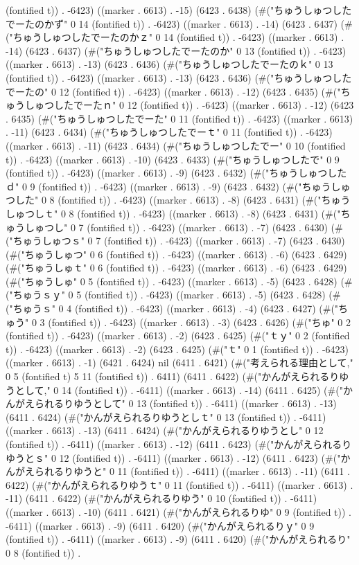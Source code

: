 (fontified t)) . -6423) ((marker . 6613) . -15) (6423 . 6438) (#("ちゅうしゅつしたでーたのかず" 0 14 (fontified t)) . -6423) ((marker . 6613) . -14) (6423 . 6437) (#("ちゅうしゅつしたでーたのかｚ" 0 14 (fontified t)) . -6423) ((marker . 6613) . -14) (6423 . 6437) (#("ちゅうしゅつしたでーたのか" 0 13 (fontified t)) . -6423) ((marker . 6613) . -13) (6423 . 6436) (#("ちゅうしゅつしたでーたのｋ" 0 13 (fontified t)) . -6423) ((marker . 6613) . -13) (6423 . 6436) (#("ちゅうしゅつしたでーたの" 0 12 (fontified t)) . -6423) ((marker . 6613) . -12) (6423 . 6435) (#("ちゅうしゅつしたでーたｎ" 0 12 (fontified t)) . -6423) ((marker . 6613) . -12) (6423 . 6435) (#("ちゅうしゅつしたでーた" 0 11 (fontified t)) . -6423) ((marker . 6613) . -11) (6423 . 6434) (#("ちゅうしゅつしたでーｔ" 0 11 (fontified t)) . -6423) ((marker . 6613) . -11) (6423 . 6434) (#("ちゅうしゅつしたでー" 0 10 (fontified t)) . -6423) ((marker . 6613) . -10) (6423 . 6433) (#("ちゅうしゅつしたで" 0 9 (fontified t)) . -6423) ((marker . 6613) . -9) (6423 . 6432) (#("ちゅうしゅつしたｄ" 0 9 (fontified t)) . -6423) ((marker . 6613) . -9) (6423 . 6432) (#("ちゅうしゅつした" 0 8 (fontified t)) . -6423) ((marker . 6613) . -8) (6423 . 6431) (#("ちゅうしゅつしｔ" 0 8 (fontified t)) . -6423) ((marker . 6613) . -8) (6423 . 6431) (#("ちゅうしゅつし" 0 7 (fontified t)) . -6423) ((marker . 6613) . -7) (6423 . 6430) (#("ちゅうしゅつｓ" 0 7 (fontified t)) . -6423) ((marker . 6613) . -7) (6423 . 6430) (#("ちゅうしゅつ" 0 6 (fontified t)) . -6423) ((marker . 6613) . -6) (6423 . 6429) (#("ちゅうしゅｔ" 0 6 (fontified t)) . -6423) ((marker . 6613) . -6) (6423 . 6429) (#("ちゅうしゅ" 0 5 (fontified t)) . -6423) ((marker . 6613) . -5) (6423 . 6428) (#("ちゅうｓｙ" 0 5 (fontified t)) . -6423) ((marker . 6613) . -5) (6423 . 6428) (#("ちゅうｓ" 0 4 (fontified t)) . -6423) ((marker . 6613) . -4) (6423 . 6427) (#("ちゅう" 0 3 (fontified t)) . -6423) ((marker . 6613) . -3) (6423 . 6426) (#("ちゅ" 0 2 (fontified t)) . -6423) ((marker . 6613) . -2) (6423 . 6425) (#("ｔｙ" 0 2 (fontified t)) . -6423) ((marker . 6613) . -2) (6423 . 6425) (#("ｔ" 0 1 (fontified t)) . -6423) ((marker . 6613) . -1) (6421 . 6424) nil (6411 . 6421) (#("考えられる理由として," 0 5 (fontified t) 5 11 (fontified t)) . 6411) (6411 . 6422) (#("かんがえられるりゆうとして," 0 14 (fontified t)) . -6411) ((marker . 6613) . -14) (6411 . 6425) (#("かんがえられるりゆうとして" 0 13 (fontified t)) . -6411) ((marker . 6613) . -13) (6411 . 6424) (#("かんがえられるりゆうとしｔ" 0 13 (fontified t)) . -6411) ((marker . 6613) . -13) (6411 . 6424) (#("かんがえられるりゆうとし" 0 12 (fontified t)) . -6411) ((marker . 6613) . -12) (6411 . 6423) (#("かんがえられるりゆうとｓ" 0 12 (fontified t)) . -6411) ((marker . 6613) . -12) (6411 . 6423) (#("かんがえられるりゆうと" 0 11 (fontified t)) . -6411) ((marker . 6613) . -11) (6411 . 6422) (#("かんがえられるりゆうｔ" 0 11 (fontified t)) . -6411) ((marker . 6613) . -11) (6411 . 6422) (#("かんがえられるりゆう" 0 10 (fontified t)) . -6411) ((marker . 6613) . -10) (6411 . 6421) (#("かんがえられるりゆ" 0 9 (fontified t)) . -6411) ((marker . 6613) . -9) (6411 . 6420) (#("かんがえられるりｙ" 0 9 (fontified t)) . -6411) ((marker . 6613) . -9) (6411 . 6420) (#("かんがえられるり" 0 8 (fontified t)) . 